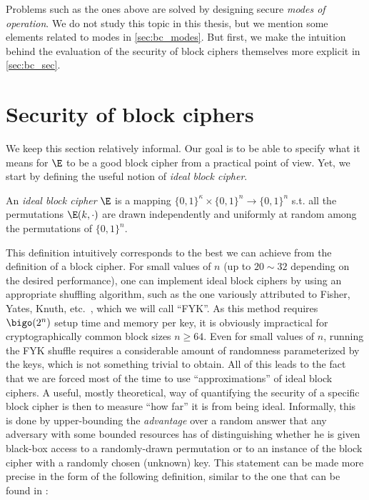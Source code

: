 Problems such as the ones above are solved by designing secure \emph{modes of operation}. We do not study this topic in this thesis, but
we mention some elements related to modes in \autoref{sec:bc_modes}. But first, we make the intuition behind the evaluation of the security
of block ciphers themselves more explicit in \autoref{sec:bc_sec}.

\section{Security of block ciphers}
\label{sec:bc_sec}

We keep this section relatively informal. Our goal is to be able to specify what it means for $\E$ to be a good block cipher from
a practical point of view. Yet, we start by defining the useful notion of \emph{ideal block cipher}.

\begin{defi}
An \emph{ideal block cipher} $\E$ is a mapping $\{0,1\}^\kappa \times \{0,1\}^n \rightarrow \{0,1\}^n$ s.t. all the permutations
$\E(k,\cdot)$ are drawn independently and uniformly at random among the permutations of $\{0,1\}^n$.
\end{defi}

This definition intuitively corresponds to the best we can achieve from the definition of a block cipher. For small values of $n$
(\eg up to $20 \sim 32$ depending on the desired performance), one can implement ideal block ciphers by using an appropriate
shuffling algorithm, such as the one variously attributed to Fisher, Yates, Knuth, etc.~\cite{uniform_shuffle}, which we will
call ``FYK''. As this method
requires $\bigo(2^n)$ setup time and memory per key, it is obviously impractical for cryptographically common block sizes $n \geq 64$.
Even for small values of $n$, running the FYK shuffle requires a considerable amount of randomness parameterized by the keys, which
is not something trivial to obtain. All of this leads to the fact that we are forced most of the time to use ``approximations'' of
ideal block ciphers. A useful, mostly theoretical, way of quantifying the security of a specific block cipher is then  to measure ``how far'' it
is from being ideal. Informally, this is done by upper-bounding the \emph{advantage} over a random answer that any adversary
with some bounded resources
has of distinguishing whether he is given black-box access to a randomly-drawn permutation or to an instance of the block cipher
with a randomly chosen (unknown) key. This statement can be made more precise in the form of the following definition,
similar to the one that can be found \eg in \cite{DBLP:journals/jcss/BellareKR00}:

